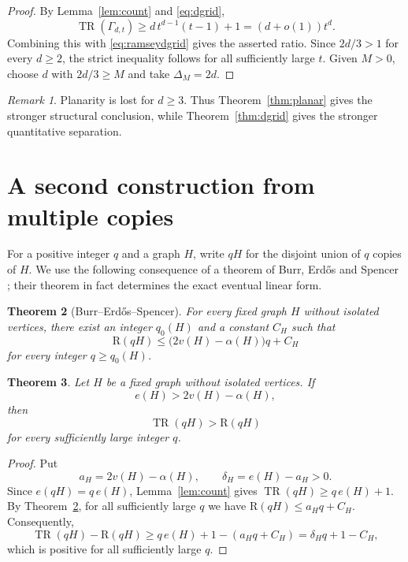 \documentclass[11pt,reqno]{amsart}
\theoremstyle{plain}
\newtheorem{theorem}{Theorem}
\theoremstyle{definition}
\theoremstyle{remark}
\newtheorem{remark}[theorem]{Remark}
\DeclareMathOperator{\TR}{TR}
\newcommand{\R}{\mathrm{R}}
\begin{document}
\begin{proof}
By Lemma~\ref{lem:count} and \eqref{eq:dgrid},
\[
\TR(\Gamma_{d,t}) \geq d\, t^{d-1}(t-1) + 1 = (d + o(1)) t^d.
\]
Combining this with \eqref{eq:ramseydgrid} gives the asserted ratio. Since $2d/3 > 1$ for every $d \geq 2$, the strict inequality follows for all sufficiently large $t$. Given $M > 0$, choose $d$ with $2d/3 \geq M$ and take $\Delta_M = 2d$.
\end{proof}

\begin{remark}
Planarity is lost for $d \geq 3$. Thus Theorem~\ref{thm:planar} gives the stronger structural conclusion, while Theorem~\ref{thm:dgrid} gives the stronger quantitative separation.
\end{remark}

\section{A second construction from multiple copies}

For a positive integer $q$ and a graph $H$, write $qH$ for the disjoint union of $q$ copies of $H$. We use the following consequence of a theorem of Burr, Erd\H{o}s and Spencer \cite{BES}; their theorem in fact determines the exact eventual linear form.

\begin{theorem}[Burr--Erd\H{o}s--Spencer]\label{thm:bes}
For every fixed graph $H$ without isolated vertices, there exist an integer $q_0(H)$ and a constant $C_H$ such that
\[
\R(qH) \leq \bigl( 2v(H) - \alpha(H) \bigr) q + C_H
\]
for every integer $q \geq q_0(H)$.
\end{theorem}

\begin{theorem}\label{thm:copies}
Let $H$ be a fixed graph without isolated vertices. If
\begin{equation}\label{eq:crit}
e(H) > 2v(H) - \alpha(H),
\end{equation}
then
\[
\TR(qH) > \R(qH)
\]
for every sufficiently large integer $q$.
\end{theorem}

\begin{proof}
Put
\[
a_H = 2v(H) - \alpha(H), \qquad \delta_H = e(H) - a_H > 0.
\]
Since $e(qH) = q\,e(H)$, Lemma~\ref{lem:count} gives $\TR(qH) \geq q\,e(H) + 1$. By Theorem~\ref{thm:bes}, for all sufficiently large $q$ we have $\R(qH) \leq a_H q + C_H$. Consequently,
\[
\TR(qH) - \R(qH) \geq q\,e(H) + 1 - (a_H q + C_H) = \delta_H q + 1 - C_H,
\]
which is positive for all sufficiently large $q$.
\end{proof}
\end{document}
